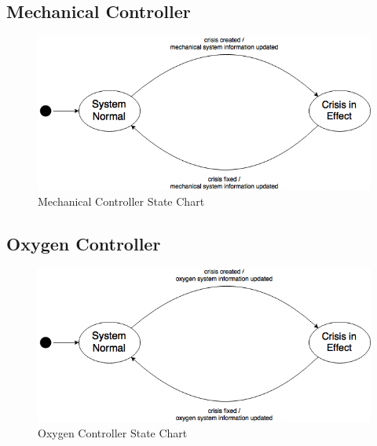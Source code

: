 \documentclass[12pt, titlepage]{article}
\begin{document}
\subsection{Mechanical Controller}
\begin{figure}[H]
\centering
\includegraphics[width=120mm]{MechanicalController.png}
\caption{Mechanical Controller State Chart}
\end{figure}

\subsection{Oxygen Controller}\begin{figure}[H]
\centering
\includegraphics[width=120mm]{OxygenController.png}
\caption{Oxygen Controller State Chart}
\end{figure}
\end{document}
